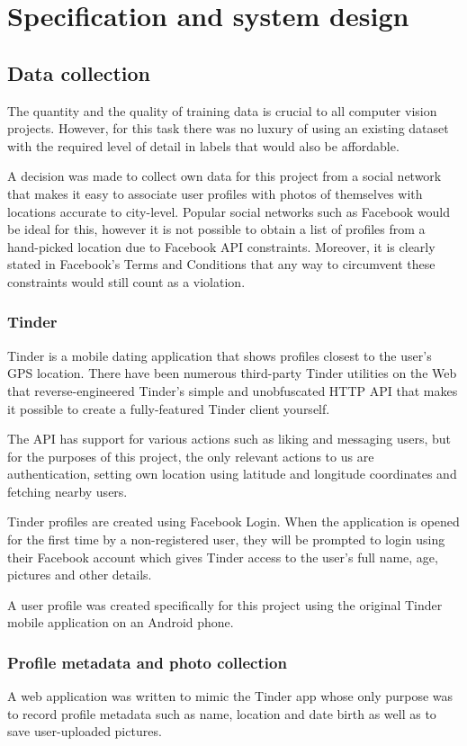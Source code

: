 \chapter{Specification and system design}
\label{spec}
\section{Data collection}
The quantity and the quality of training data is crucial to all computer vision 
projects. However, for this task there was no luxury of using an existing 
dataset with the required level of detail in labels that would also be 
affordable.

A decision was made to collect own data for this project from a social network 
that makes it easy to associate user profiles with photos of themselves with 
locations accurate to city-level. Popular social networks such as Facebook 
would be ideal for this, however it is not possible to obtain a list of 
profiles from a hand-picked location due to Facebook API constraints. 
Moreover, it is clearly stated in Facebook's Terms and Conditions that any way 
to circumvent these constraints would still count as a violation.


\subsection{Tinder}
Tinder is a mobile dating application that shows profiles closest to the 
user's GPS location. There have been numerous third-party Tinder utilities on 
the Web that reverse-engineered Tinder's simple and unobfuscated HTTP API that 
makes it possible to create a fully-featured Tinder client yourself.

The API has support for various actions such as liking and messaging users, 
but for the purposes of this project, the only relevant actions to us are 
authentication, setting own location using latitude and longitude coordinates 
and fetching nearby users.

Tinder profiles are created using Facebook Login. When the application is 
opened for the first time by a non-registered user, they will be prompted to 
login using their Facebook account which gives Tinder access to the user's full name, 
age, pictures and other details.

A user profile was created specifically for this project using the original 
Tinder mobile application on an Android phone. 

\subsection{Profile metadata and photo collection}
A web application was written to mimic the Tinder app whose only purpose was 
to record profile metadata such as name, location and date birth as well as 
to save user-uploaded pictures. 

